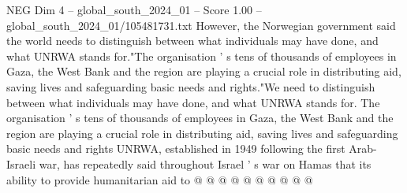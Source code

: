 \begin{textsample}{NEG Dim 4 – global\_south\_2024\_01 – Score 1.00 – global\_south\_2024\_01/105481731.txt}
However, the Norwegian government said the world needs to distinguish between what individuals may have done, and what UNRWA stands for."The organisation ' s tens of thousands of employees in Gaza, the West Bank and the region are playing a crucial role in distributing aid, saving lives and safeguarding basic needs and rights."We need to distinguish between what individuals may have done, and what UNRWA stands for.
The organisation ' s tens of thousands of employees in Gaza, the West Bank and the region are playing a crucial role in distributing aid, saving lives and safeguarding basic needs and rights UNRWA, established in 1949 following the first Arab-Israeli war, has repeatedly said throughout Israel ' s war on Hamas that its ability to provide humanitarian aid to @ @ @ @ @ @ @ @ @ @

\end{textsample}
